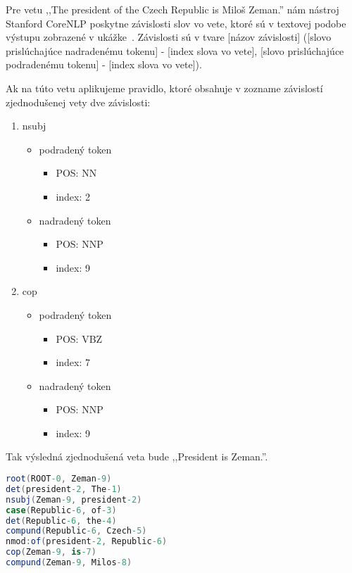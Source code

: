 Pre vetu ,,The president of the Czech Republic is Miloš Zeman.'' nám nástroj Stanford CoreNLP poskytne závislosti slov vo vete, ktoré sú v textovej podobe výstupu zobrazené v ukážke~. Závislosti sú v tvare [názov závislosti] ([slovo prislúchajúce nadradenému tokenu] - [index slova vo vete], [slovo prislúchajúce podradenému tokenu] - [index slova vo vete]).

Ak na túto vetu aplikujeme pravidlo, ktoré obsahuje v zozname závislostí zjednodušenej vety dve závislosti:
\begin{enumerate}
	\item nsubj
	\begin{itemize}
		\item podradený token
		\begin{itemize}
			\item POS: NN
			\item index: 2
		\end{itemize}
		\item nadradený token
		\begin{itemize}
			\item POS: NNP
			\item index: 9
		\end{itemize}
	\end{itemize}
	
	\item cop
	\begin{itemize}
		\item podradený token
		\begin{itemize}
			\item POS: VBZ
			\item index: 7
		\end{itemize}
		\item nadradený token
		\begin{itemize}
			\item POS: NNP
			\item index: 9
		\end{itemize}
	\end{itemize}
\end{enumerate}

Tak výsledná zjednodušená veta bude ,,President is Zeman.''. \\

\begin{lstlisting}[language = csharp, caption={Závislosti jednoduchej vety}, label = {code:sentence_dependencies}]
root(ROOT-0, Zeman-9)
det(president-2, The-1)
nsubj(Zeman-9, president-2)
case(Republic-6, of-3)
det(Republic-6, the-4)
compund(Republic-6, Czech-5)
nmod:of(president-2, Republic-6)
cop(Zeman-9, is-7)
compund(Zeman-9, Milos-8)
\end{lstlisting}